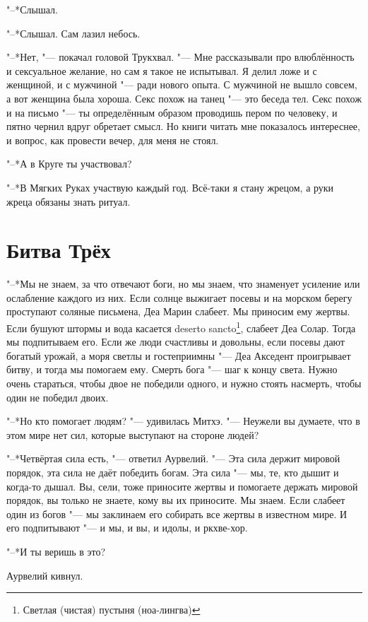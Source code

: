 \documentclass[a4paper,10pt]{book}
\begin{document}
"--*Слышал.

"--*Слышал. Сам лазил небось.

"--*Нет, "--- покачал головой Трукхвал. "--- Мне рассказывали про влюблённость 
и 
сексуальное желание, 
но сам я такое не испытывал. Я делил ложе и с женщиной, и с мужчиной "--- ради 
нового опыта.
С мужчиной не вышло совсем, а вот женщина была хороша. Секс похож на танец "--- 
это беседа тел.
Секс похож и на письмо "--- ты определённым образом проводишь пером по 
человеку, 
и пятно чернил вдруг обретает смысл.
Но книги читать мне показалось интереснее, и вопрос, как провести вечер, для 
меня не стоял.

"--*А в Круге ты участвовал?

"--*В Мягких Руках участвую каждый год. Всё-таки я стану жрецом, а руки жреца 
обязаны знать ритуал.

\section{Битва Трёх}

"--*Мы не знаем, за что отвечают боги, но мы знаем, что знаменует усиление или 
ослабление каждого из них. Если солнце выжигает посевы и на морском берегу 
проступают соляные письмена, Деа Марин слабеет. Мы приносим ему жертвы. Если 
бушуют штормы и вода касается deserto sancto\footnote{Светлая (чистая) пустыня 
(ноа-лингва)}, слабеет Деа Солар. Тогда мы 
подпитываем его. Если же люди счастливы и довольны, если посевы дают богатый 
урожай, а моря светлы и гостеприимны "--- Деа Акседент проигрывает битву, и 
тогда мы помогаем ему. Смерть бога "--- шаг к концу света. Нужно очень 
стараться, чтобы двое не победили одного, и нужно стоять насмерть, чтобы один 
не победил двоих.

"--*Но кто помогает людям? "--- удивилась Митхэ. "--- Неужели вы думаете, что в 
этом мире нет сил, которые выступают на стороне людей?

"--*Четвёртая сила есть, "--- ответил Аурвелий. "--- Эта сила держит мировой 
порядок, эта сила не даёт победить богам. Эта сила "--- мы, те, кто дышит и 
когда-то дышал. Вы, сели, тоже приносите жертвы и помогаете держать мировой 
порядок, вы только не знаете, кому вы их приносите. Мы знаем. Если слабеет один 
из богов "--- мы заклинаем его собирать все жертвы в известном мире. И его 
подпитывают "--- и мы, и вы, и идолы, и ркхве-хор.

"--*И ты веришь в это?

Аурвелий кивнул.
\end{document}
